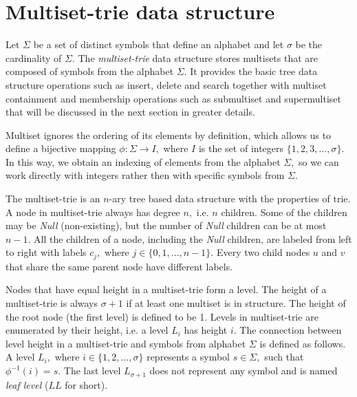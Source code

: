 \section{Multiset-trie data structure} \label{c:description}
%
Let $\Sigma$ be a set of distinct symbols that define an alphabet and let 
$\sigma$ be the cardinality of $\Sigma.$ The \emph{multiset-trie} data structure 
stores multisets that are composed of symbols from the alphabet $\Sigma.$ It 
provides the basic tree data structure operations such as insert, delete and 
search together with multiset containment and membership operations such as 
submultiset and supermultiset that will be discussed in the next section 
in greater details.

Multiset ignores the ordering of its elements by definition, which allows us to 
define a bijective mapping $\phi:\Sigma \rightarrow I,$ where $I$ is the set of 
integers $\{ 1,2,3, \ldots, \sigma \}.$ In this way, we obtain an indexing of 
elements from the alphabet $\Sigma,$ so we can work directly with integers 
rather then with specific symbols from $\Sigma.$

The multiset-trie is an $n$-ary tree based data structure with the properties of 
trie. A node in multiset-trie always has degree $n,$ i.e. $n$ children. Some of 
the children may be \emph{Null} (non-existing), but the number of \emph{Null} 
children can be at most $n-1.$ All the children of a node, including the \emph{Null} 
children, are labeled from left to right with labels $c_j,$ where $j\in \{ 0, 1, \ldots, n-1 \}.$ 
Every two child nodes $u$ and $v$ that share the same parent node have different labels.


Nodes that have equal height in a multiset-trie form a level. The height of a 
multiset-trie is always $\sigma+1$ if at least one multiset is in structure. 
The height of the root node (the first level) is defined to be 1.
%
Levels in multiset-trie are enumerated by their height, i.e. a level $L_i$ has 
height $i.$ The connection between level height in a multiset-trie and symbols 
from alphabet $\Sigma$ is defined as follows. A level $L_i,$ where 
$i\in\{ 1,2,\ldots, \sigma \}$ represents a symbol $s\in\Sigma,$ such that 
$\phi^{-1}(i) = s.$ The last level $L_{\sigma+1}$ does not represent any symbol 
and is named \emph{leaf level} ($LL$ for short).


